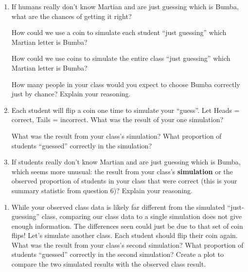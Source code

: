 \documentclass[
]{report}
\providecommand{\tightlist}{%
  \setlength{\itemsep}{0pt}\setlength{\parskip}{0pt}}
\begin{document}
\begin{enumerate}
\def\labelenumi{\arabic{enumi}.}
\setcounter{enumi}{8}
\item
  If humans really don't know Martian and are just guessing which is Bumba, what are the chances of getting it right?
  \vspace{0.3in}

  How could we use a coin to simulate each student ``just guessing'' which Martian letter is Bumba?
  \vspace{.9in}

  How could we use coins to simulate the entire class ``just guessing'' which Martian letter is Bumba?
  \vspace{.9in}

  How many people in your class would you expect to choose Bumba correctly just by chance? Explain your reasoning.
  \vspace{.9in}
\item
  Each student will flip a coin one time to simulate your ``guess''. Let Heads = correct, Tails = incorrect. What was the result of your one simulation?
  \vspace{.3in}

  What was the result from your class's simulation? What proportion of students ``guessed'' correctly in the simulation?
  \vspace{.3in}
\item
  If students really don't know Martian and are just guessing which is Bumba, which seems more unusual: the result from your class's \textbf{simulation} or the observed proportion of students in your class that were correct (this is your summary statistic from question 6)? Explain your reasoning.
\end{enumerate}

\newpage

\begin{enumerate}
\def\labelenumi{\arabic{enumi}.}
\setcounter{enumi}{11}
\tightlist
\item
  While your observed class data is likely far different from the simulated ``just-guessing'' class, comparing our class data to a single simulation does not give enough information. The differences seen could just be due to that set of coin flips! Let's simulate another class. Each student should flip their coin again. What was the result from your class's second simulation? What proportion of students ``guessed'' correctly in the second simulation? Create a plot to compare the two simulated results with the observed class result.
\end{enumerate}
\end{document}

